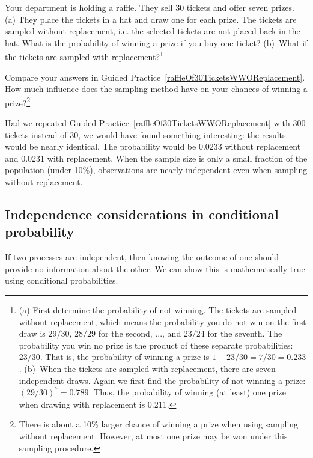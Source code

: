 \begin{exercise} \label{raffleOf30TicketsWWOReplacement}
Your department is holding a raffle. They sell 30 tickets and offer seven prizes. (a) They place the tickets in a hat and draw one for each prize. The tickets are sampled without replacement, i.e. the selected tickets are not placed back in the hat. What is the probability of winning a prize if you buy one ticket? (b)~What if the tickets are sampled with replacement?\footnote{(a) First determine the probability of not winning. The tickets are sampled without replacement, which means the probability you do not win on the first draw is $29/30$, $28/29$ for the second, ..., and $23/24$ for the seventh. The probability you win no prize is the product of these separate probabilities: $23/30$. That is, the probability of winning a prize is $1 - 23/30 = 7/30 = 0.233$. (b)~When the tickets are sampled with replacement, there are seven independent draws. Again we first find the probability of not winning a prize: $(29/30)^7 = 0.789$. Thus, the probability of winning (at least) one prize when drawing with replacement is 0.211.}
\end{exercise}

\begin{exercise} \label{followUpToRaffleOf30TicketsWWOReplacement}
Compare your answers in Guided Practice~\ref{raffleOf30TicketsWWOReplacement}. How much influence does the sampling method have on your chances of winning a prize?\footnote{There is about a 10\% larger chance of winning a prize when using sampling without replacement. However, at most one prize may be won under this sampling procedure.}
\end{exercise}

Had we repeated Guided Practice~\ref{raffleOf30TicketsWWOReplacement} with 300 tickets instead of 30, we would have found something interesting: the results would be nearly identical. The probability would be 0.0233 without replacement and 0.0231 with replacement. When the sample size is only a small fraction of the population (under 10\%), observations are nearly independent even when sampling without replacement.



\subsection{Independence considerations in conditional probability}

If two processes are independent, then knowing the outcome of one should provide no information about the other. We can show this is mathematically true using conditional probabilities.

